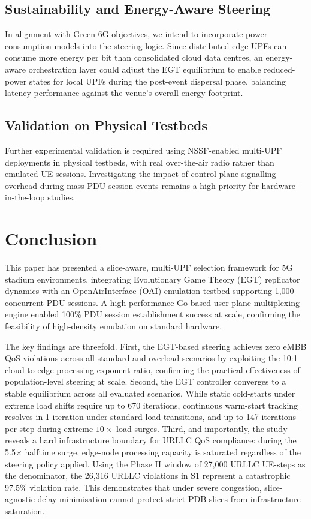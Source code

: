 \documentclass[conference]{IEEEtran}
\begin{document}
\subsection{Sustainability and Energy-Aware Steering}

In alignment with Green-6G objectives, we intend to
incorporate power consumption models into the steering
logic. Since distributed edge UPFs can consume more
energy per bit than consolidated cloud data centres, an
energy-aware orchestration layer could adjust the EGT
equilibrium to enable reduced-power states for local
UPFs during the post-event dispersal phase, balancing
latency performance against the venue's overall energy
footprint.

\subsection{Validation on Physical Testbeds}

Further experimental validation is required using
NSSF-enabled multi-UPF deployments in physical testbeds,
with real over-the-air radio rather than emulated UE
sessions. Investigating the impact of control-plane
signalling overhead during mass PDU session events
remains a high priority for hardware-in-the-loop
studies.

\section{Conclusion}

This paper has presented a slice-aware, multi-UPF
selection framework for 5G stadium environments,
integrating Evolutionary Game Theory (EGT) replicator
dynamics with an OpenAirInterface (OAI) emulation
testbed supporting 1,000 concurrent PDU sessions. A
high-performance Go-based user-plane multiplexing engine
enabled 100\% PDU session establishment success at scale,
confirming the feasibility of high-density emulation on
standard hardware.

The key findings are threefold. First, the EGT-based
steering achieves zero eMBB QoS violations across all
standard and overload scenarios by exploiting the
10:1 cloud-to-edge processing exponent ratio, confirming
the practical effectiveness of population-level steering
at scale. Second, the EGT controller converges to a stable 
equilibrium across all evaluated scenarios. While static 
cold-starts under extreme load shifts require up to 670 
iterations, continuous warm-start tracking resolves in 1 
iteration under standard load transitions, and up to 147 iterations 
per step during extreme $10\times$ load surges. Third, and importantly,
the study reveals a hard infrastructure boundary for
URLLC QoS compliance: during the 5.5$\times$ halftime
surge, edge-node processing capacity is saturated
regardless of the steering policy applied. Using the Phase II 
window of 27,000 URLLC UE-steps as the denominator, the 26,316 
URLLC violations in S1 represent a catastrophic 97.5\% violation rate. 
This demonstrates that under severe congestion, slice-agnostic delay 
minimisation cannot protect strict PDB slices from infrastructure saturation.
\end{document}
